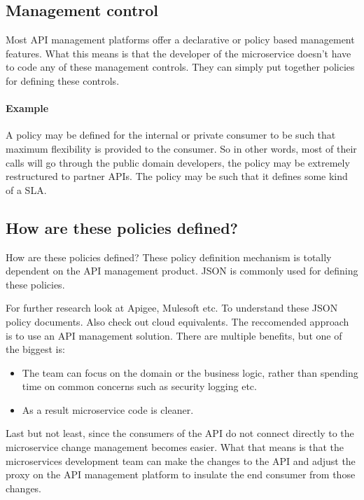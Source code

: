 \subsection{Management control}
Most API management platforms offer a declarative or policy based management features.
What this means is that the developer of the microservice doesn't have to code any of these management controls.
They can simply put together policies for defining these controls.

\paragraph{Example} A policy may be defined for the internal or private consumer to be such that maximum flexibility is provided to the consumer.
So in other words, most of their calls will go through the public domain developers, the policy may be extremely restructured to partner APIs.
The policy may be such that it defines some kind of a SLA.

\subsection{How are these policies defined?}
How are these policies defined?
These policy definition mechanism is totally dependent on the API management product.
JSON is commonly used for defining these policies.

For further research look at Apigee, Mulesoft etc.
To understand these JSON policy documents. Also check out cloud equivalents.
The reccomended approach is to use an API management solution.
There are multiple benefits, but one of the biggest is:
\begin{itemize}
    \item The team can focus on the domain or the business logic, rather than spending time on common concerns such as security logging etc.
    \item As a result microservice code is cleaner.
\end{itemize}

Last but not least, since the consumers of the API do not connect directly to the microservice change management becomes easier.
What that means is that the microservices development team can make the changes to the API and adjust the proxy on the API management platform to insulate the end consumer from those changes.

